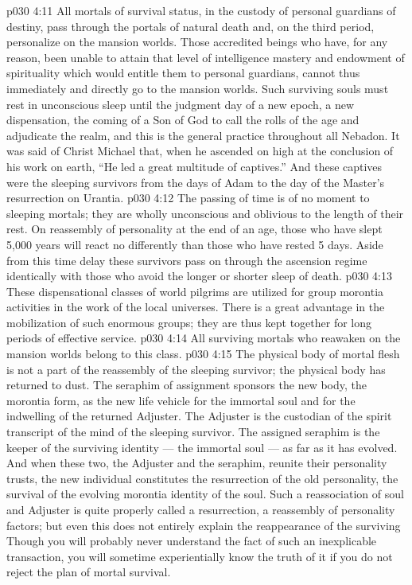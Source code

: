 \vs p030 4:11 \bibnobreakspace {} All mortals of survival status, in the custody of personal guardians of destiny, pass through the portals of natural death and, on the third period, personalize on the mansion worlds. Those accredited beings who have, for any reason, been unable to attain that level of intelligence mastery and endowment of spirituality which would entitle them to personal guardians, cannot thus immediately and directly go to the mansion worlds. Such surviving souls must rest in unconscious sleep until the judgment day of a new epoch, a new dispensation, the coming of a Son of God to call the rolls of the age and adjudicate the realm, and this is the general practice throughout all Nebadon. It was said of Christ Michael that, when he ascended on high at the conclusion of his work on earth, “He led a great multitude of captives.” And these captives were the sleeping survivors from the days of Adam to the day of the Master’s resurrection on Urantia.
\vs p030 4:12 The passing of time is of no moment to sleeping mortals; they are wholly unconscious and oblivious to the length of their rest. On reassembly of personality at the end of an age, those who have slept 5,000 years will react no differently than those who have rested 5 days. Aside from this time delay these survivors pass on through the ascension regime identically with those who avoid the longer or shorter sleep of death.
\vs p030 4:13 These dispensational classes of world pilgrims are utilized for group morontia activities in the work of the local universes. There is a great advantage in the mobilization of such enormous groups; they are thus kept together for long periods of effective service.
\vs p030 4:14 \bibnobreakspace {} All surviving mortals who reawaken on the mansion worlds belong to this class.
\vs p030 4:15 The physical body of mortal flesh is not a part of the reassembly of the sleeping survivor; the physical body has returned to dust. The seraphim of assignment sponsors the new body, the morontia form, as the new life vehicle for the immortal soul and for the indwelling of the returned Adjuster. The Adjuster is the custodian of the spirit transcript of the mind of the sleeping survivor. The assigned seraphim is the keeper of the surviving identity --- the immortal soul --- as far as it has evolved. And when these two, the Adjuster and the seraphim, reunite their personality trusts, the new individual constitutes the resurrection of the old personality, the survival of the evolving morontia identity of the soul. Such a reassociation of soul and Adjuster is quite properly called a resurrection, a reassembly of personality factors; but even this does not entirely explain the reappearance of the surviving  Though you will probably never understand the fact of such an inexplicable transaction, you will sometime experientially know the truth of it if you do not reject the plan of mortal survival.
